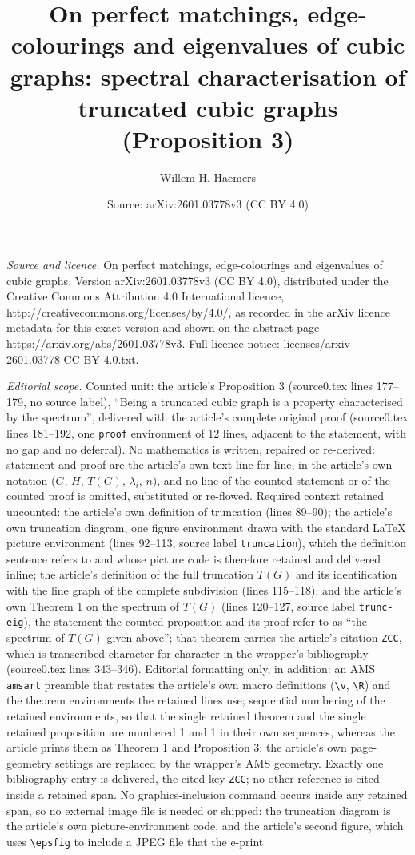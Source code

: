 \documentclass[10pt,a4paper]{amsart}
\title[On perfect matchings, edge-colourings and eigenvalues of cubic graphs]{On perfect matchings, edge-colourings and eigenvalues of cubic graphs: spectral characterisation of truncated cubic graphs (Proposition 3)}
\author{Willem H. Haemers}
\date{Source: arXiv:2601.03778v3 (CC BY 4.0)}
\begin{document}
\maketitle

\noindent\emph{Source and licence.} On perfect matchings, edge-colourings and eigenvalues of cubic graphs. Version arXiv:2601.03778v3 (CC BY 4.0), distributed under the Creative Commons Attribution 4.0 International licence, http://creativecommons.org/licenses/by/4.0/, as recorded in the arXiv licence metadata for this exact version and shown on the abstract page https://arxiv.org/abs/2601.03778v3. Full licence notice: licenses/arxiv-2601.03778-CC-BY-4.0.txt.\par\smallskip

\noindent\textit{Editorial scope.} Counted unit: the article's Proposition 3 (source0.tex lines 177--179, no source label), ``Being a truncated cubic graph is a property characterised by the spectrum'', delivered with the article's complete original proof (source0.tex lines 181--192, one \texttt{proof} environment of 12 lines, adjacent to the statement, with no gap and no deferral). No mathematics is written, repaired or re-derived: statement and proof are the article's own text line for line, in the article's own notation ($G$, $H$, $T(G)$, $\lambda_i$, $n$), and no line of the counted statement or of the counted proof is omitted, substituted or re-flowed. Required context retained uncounted: the article's own definition of truncation (lines 89--90); the article's own truncation diagram, one figure environment drawn with the standard LaTeX picture environment (lines 92--113, source label \texttt{truncation}), which the definition sentence refers to and whose picture code is therefore retained and delivered inline; the article's definition of the full truncation $T(G)$ and its identification with the line graph of the complete subdivision (lines 115--118); and the article's own Theorem 1 on the spectrum of $T(G)$ (lines 120--127, source label \texttt{trunc-eig}), the statement the counted proposition and its proof refer to as ``the spectrum of $T(G)$ given above''; that theorem carries the article's citation \texttt{ZCC}, which is transcribed character for character in the wrapper's bibliography (source0.tex lines 343--346). Editorial formatting only, in addition: an AMS \texttt{amsart} preamble that restates the article's own macro definitions (\texttt{\textbackslash v}, \texttt{\textbackslash R}) and the theorem environments the retained lines use; sequential numbering of the retained environments, so that the single retained theorem and the single retained proposition are numbered 1 and 1 in their own sequences, whereas the article prints them as Theorem 1 and Proposition 3; the article's own page-geometry settings are replaced by the wrapper's AMS geometry. Exactly one bibliography entry is delivered, the cited key \texttt{ZCC}; no other reference is cited inside a retained span. No graphics-inclusion command occurs inside any retained span, so no external image file is needed or shipped: the truncation diagram is the article's own picture-environment code, and the article's second figure, which uses \texttt{\textbackslash epsfig} to include a JPEG file that the e-print 
\end{document}
